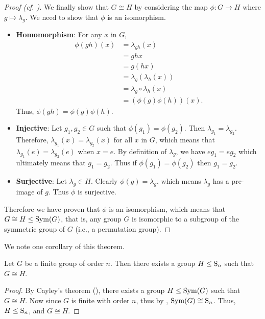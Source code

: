 \begin{proof}[Proof (cf. {\cite[Proof 2]{proofwiki_cayleys-theorem}})]
    We finally show that $G \cong H$ by considering the map $\phi: G\to H$ where $g \mapsto \lambda_g$. We need to show that $\phi$ is an isomorphism.
    \begin{itemize}
        \item \textbf{Homomorphism}: For any $x$ in $G$,
            \begin{align*}
                \phi(gh)(x) &= \lambda_{gh}(x)\\
                &= ghx\\
                &= g(hx)\\
                &= \lambda_g\left(\lambda_h(x)\right)\\
                &= \lambda_g\circ\lambda_h(x)\\
                &= (\phi(g)\phi(h))(x).
            \end{align*}
            Thus, $\phi(gh) = \phi(g)\phi(h)$.
        
        \item \textbf{Injective}: Let $g_1, g_2 \in G$ such that $\phi(g_1) = \phi(g_2)$. Then $\lambda_{g_1} = \lambda_{g_2}$. Therefore, $\lambda_{g_1}(x) = \lambda_{g_2}(x)$ for all $x$ in $G$, which means that $\lambda_{g_1}(e) = \lambda_{g_2}(e)$ when $x = e$. By definition of $\lambda_g$, we have $eg_1 = eg_2$ which ultimately means that $g_1=g_2$. Thus if $\phi(g_1) = \phi(g_2)$ then $g_1=g_2$.
        
        \item \textbf{Surjective}: Let $\lambda_g \in H$. Clearly $\phi(g) = \lambda_g$, which means $\lambda_g$ has a pre-image of $g$. Thus $\phi$ is surjective.
    \end{itemize}
    Therefore we have proven that $\phi$ is an isomorphism, which means that $G \cong H \leq \mathrm{Sym}(G)$, that is, any group $G$ is isomorphic to a subgroup of the symmetric group of $G$ (i.e., a permutation group).
\end{proof}

We note one corollary of this theorem.
\begin{corollary}
    Let $G$ be a finite group of order $n$. Then there exists a group $H \leq \mathrm{S}_{n}$ such that $G \cong H$.
\end{corollary}
\begin{proof}
    By Cayley's theorem (), there exists a group $H \leq \mathrm{Sym}(G)$ such that $G \cong H$. Now since $G$ is finite with order $n$, thus by , $\mathrm{Sym}(G) \cong \mathrm{S}_{n}$. Thus, $H \leq \mathrm{S}_{n}$, and $G \cong H$.
\end{proof}

